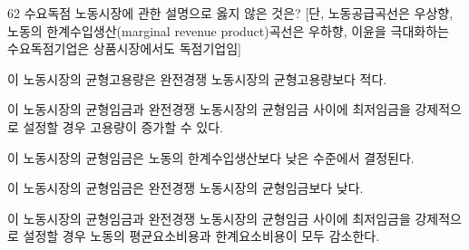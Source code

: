 \begin{question}{62}
수요독점 노동시장에 관한 설명으로 옳지 않은 것은? [단, 노동공급곡선은 우상향, 노동의 한계수입생산(marginal revenue product)곡선은 우하향, 이윤을 극대화하는 수요독점기업은 상품시장에서도 독점기업임]
\begin{choices}
  \item 이 노동시장의 균형고용량은 완전경쟁 노동시장의 균형고용량보다 적다.
  \item 이 노동시장의 균형임금과 완전경쟁 노동시장의 균형임금 사이에 최저임금을 강제적으로 설정할 경우 고용량이 증가할 수 있다.
  \item 이 노동시장의 균형임금은 노동의 한계수입생산보다 낮은 수준에서 결정된다.
  \item 이 노동시장의 균형임금은 완전경쟁 노동시장의 균형임금보다 낮다.
  \item 이 노동시장의 균형임금과 완전경쟁 노동시장의 균형임금 사이에 최저임금을 강제적으로 설정할 경우 노동의 평균요소비용과 한계요소비용이 모두 감소한다.
\end{choices}
\end{question}
